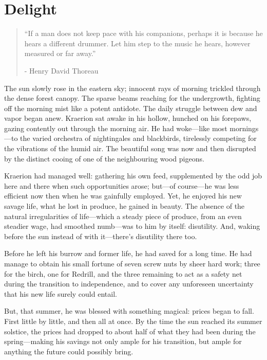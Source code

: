 \chapter{Delight}

\vspace{-1.3cm}
\begin{localsize}{10}
	\begin{quote}
		“If a man does not keep pace with his companions, perhaps it is because he hears a different drummer. Let him step to the music he hears, however measured or far away.”
		\begin{flushright}- Henry David Thoreau \end{flushright}
	\end{quote} 
\end{localsize}
\vspace{1cm}

The sun slowly rose in the eastern sky; innocent rays of morning trickled through the dense forest canopy. The sparse beams reaching for the undergrowth, fighting off the morning mist like a potent antidote. The daily struggle between dew and vapor began anew. Kraerion sat awake in his hollow, hunched on his forepaws, gazing contently out through the morning air. He had woke---like most mornings---to the varied orchestra of nightingales and blackbirds, tirelessly competing for the vibrations of the humid air. The beautiful song was now and then disrupted by the distinct cooing of one of the neighbouring wood pigeons.

Kraerion had managed well: gathering his own feed, supplemented by the odd job here and there when such opportunities arose; but---of course---he was less efficient now then when he was gainfully employed. Yet, he enjoyed his new savage life, what he lost in produce, he gained in beauty. The absence of the natural irregularities of life---which a steady piece of produce, from an even steadier wage, had smoothed numb---was to him by itself: disutility. And, waking before the sun instead of with it---there's disutility there too.

Before he left his burrow and former life, he had saved for a long time. He had manage to obtain his small fortune of seven screw nuts by sheer hard work; three for the birch, one for Redrill, and the three remaining to act as a safety net during the transition to independence, and to cover any unforeseen uncertainty that his new life surely could entail.

But, that summer, he was blessed with something magical: prices began to fall. First little by little, and then all at once. By the time the sun reached its summer solstice, the prices had dropped to about half of what they had been during the spring---making his savings not only ample for his transition, but ample for anything the future could possibly bring.


